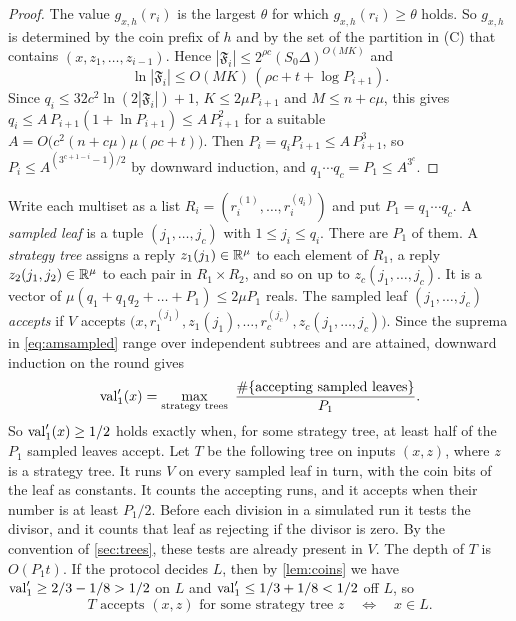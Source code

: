 \begin{proof}
The value $g_{x,h}(r_i)$ is the largest $\theta$ for which $g_{x,h}(r_i)\ge\theta$ holds.
So $g_{x,h}$ is determined by the coin prefix of $h$ and by the set of the partition in \textup{(C)} that contains $(x,z_1,\dots,z_{i-1})$.
Hence $|\mathfrak F_i|\le2^{\rho c}(S_0\Delta)^{O(MK)}$ and
\[
\ln|\mathfrak F_i|\le O(MK)\,(\rho c+t+\log P_{i+1}).
\]
Since $q_i\le32c^2\ln(2|\mathfrak F_i|)+1$, $K\le2\mu P_{i+1}$ and $M\le n+c\mu$, this gives $q_i\le A\,P_{i+1}(1+\ln P_{i+1})\le A\,P_{i+1}^2$ for a suitable $A=O\bigl(c^2(n+c\mu)\mu(\rho c+t)\bigr)$.
Then $P_i=q_iP_{i+1}\le A\,P_{i+1}^3$, so $P_i\le A^{(3^{c+1-i}-1)/2}$ by downward induction, and $q_1\cdots q_c=P_1\le A^{3^c}$.
\end{proof}

Write each multiset as a list $R_i=(r_i^{(1)},\dots,r_i^{(q_i)})$ and put $P_1=q_1\cdots q_c$.
A \emph{sampled leaf} is a tuple $(j_1,\dots,j_c)$ with $1\le j_i\le q_i$.
There are $P_1$ of them.
A \emph{strategy tree} assigns a reply $z_1(j_1)\in\mathbb{R}^\mu$ to each element of $R_1$, a reply $z_2(j_1,j_2)\in\mathbb{R}^\mu$ to each pair in $R_1\times R_2$, and so on up to $z_c(j_1,\dots,j_c)$.
It is a vector of $\mu(q_1+q_1q_2+\dots+P_1)\le2\mu P_1$ reals.
The sampled leaf $(j_1,\dots,j_c)$ \emph{accepts} if $V$ accepts $\bigl(x,r_1^{(j_1)},z_1(j_1),\dots,r_c^{(j_c)},z_c(j_1,\dots,j_c)\bigr)$.
Since the suprema in \eqref{eq:amsampled} range over independent subtrees and are attained, downward induction on the round gives
\begin{equation}\label{eq:strategytree}
\operatorname{val}'_1(x)=\max_{\text{strategy trees}}\ \frac{\#\{\text{accepting sampled leaves}\}}{P_1} .
\end{equation}
So $\operatorname{val}'_1(x)\ge1/2$ holds exactly when, for some strategy tree, at least half of the $P_1$ sampled leaves accept.
Let $T$ be the following tree on inputs $(x,z)$, where $z$ is a strategy tree.
It runs $V$ on every sampled leaf in turn, with the coin bits of the leaf as constants.
It counts the accepting runs, and it accepts when their number is at least $P_1/2$.
Before each division in a simulated run it tests the divisor, and it counts that leaf as rejecting if the divisor is zero.
By the convention of \cref{sec:trees}, these tests are already present in $V$.
The depth of $T$ is $O(P_1t)$.
If the protocol decides $L$, then by \cref{lem:coins} we have $\operatorname{val}'_1\ge2/3-1/8>1/2$ on $L$ and $\operatorname{val}'_1\le1/3+1/8<1/2$ off $L$, so
\begin{equation}\label{eq:amcert}
T\text{ accepts }(x,z)\text{ for some strategy tree }z\quad\Longleftrightarrow\quad x\in L .
\end{equation}

